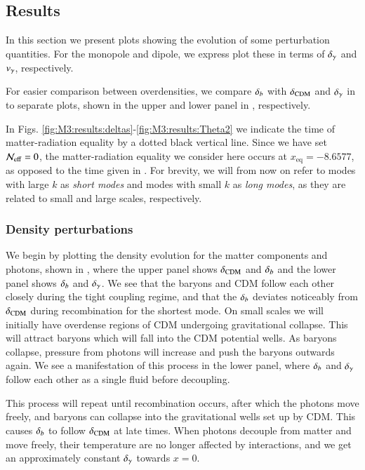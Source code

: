 \subsection{Results}\label{ssec:M3:results}

In this section we present plots showing the evolution of some perturbation quantities. For the monopole and dipole, we express plot these in terms of $\delta_\gamma$ and $v_\gamma$, respectively. 

For easier comparison between overdensities, we compare $\delta_b$ with $\delta_\mathrm{CDM}$ and $\delta_\gamma$ in to separate plots, shown in the upper and lower panel in , respectively. 

In Figs. \ref{fig:M3:results:deltas}-\ref{fig:M3:results:Theta2} we indicate the time of matter-radiation equality by a dotted black vertical line. Since we have set $\mathcal{N}_\mathrm{eff}=0$, the matter-radiation equality we consider here occurs at $x_\mathrm{eq}=-8.6577$, as opposed to the time given in . For brevity, we will from now on refer to modes with large $k$ as \textit{short modes} and modes with small $k$ as \textit{long modes}, as they are related to small and large scales, respectively.       

\subsubsection{Density perturbations} \label{sssec:M3:results:density_perturbations}
We begin by plotting the density evolution for the matter components and photons, shown in , where the upper panel shows $\delta_\mathrm{CDM}$ and $\delta_b$ and the lower panel shows $\delta_b$ and $\delta_\gamma$. We see that the baryons and CDM follow each other closely during the tight coupling regime, and that the $\delta_b$ deviates noticeably from $\delta_\mathrm{CDM}$ during recombination for the shortest mode. On small scales we will initially have overdense regions of CDM undergoing gravitational collapse. This will attract baryons which will fall into the CDM potential wells. As baryons collapse, pressure from photons will increase and push the baryons outwards again. We see a manifestation of this process in the lower panel, where $\delta_b$ and $\delta_\gamma$ follow each other as a single fluid before decoupling. 

This process will repeat until recombination occurs, after which the photons move freely, and baryons can collapse into the gravitational wells set up by CDM. This causes $\delta_b$ to follow $\delta_\mathrm{CDM}$ at late times. When photons decouple from matter and move freely, their temperature are no longer affected by interactions, and we get an approximately constant $\delta_\gamma$ towards $x=0$.  

